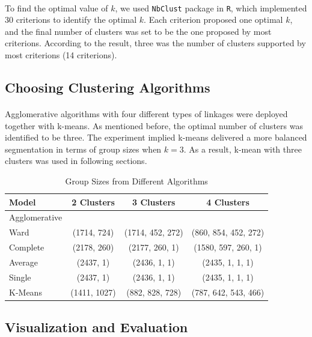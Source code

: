 \documentclass[11pt]{article}
\begin{document}
	\paragraph{} To find the optimal value of $k$, we used \texttt{NbClust} package in \texttt{R}, which implemented 30 criterions to identify the optimal $k$. Each criterion proposed one optimal $k$, and the final number of clusters was set to be the one proposed by most criterions. According to the result, three was the number of clusters supported by most criterions (14 criterions).

	\subsection{Choosing Clustering Algorithms}
	\paragraph{} Agglomerative algorithms with four different types of linkages were deployed together with k-means. As mentioned before, the optimal number of clusters was identified to be three. The experiment implied k-means delivered a more balanced segmentation in terms of group sizes when $k=3$. As a result, k-mean with three clusters was used in following sections.
	
	\begin{table}[H]
		\centering
		\begin{tabular}{l|c|c|c}
			Model & 2 Clusters & 3 Clusters & 4 Clusters \\
			\hline
			\hline
			Agglomerative \\
			\hline
			Ward & (1714, 724) & (1714, 452, 272) & (860, 854, 452, 272) \\
			Complete & (2178, 260) & (2177, 260, 1) & (1580, 597, 260, 1) \\
			Average & (2437, 1) & (2436, 1, 1) & (2435, 1, 1, 1) \\
			Single & (2437, 1) & (2436, 1, 1) & (2435, 1, 1, 1) \\
			\hline
			\hline
			K-Means & (1411, 1027) & (882, 828, 728) & (787, 642, 543, 466)
		\end{tabular}
		\caption{Group Sizes from Different Algorithms}
	\end{table}
	
	\subsection{Visualization and Evaluation}
\end{document}
